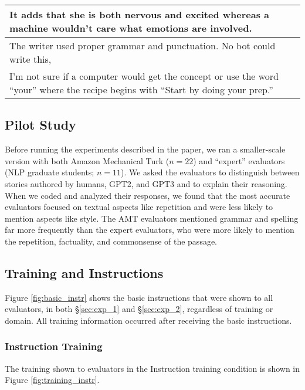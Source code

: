 \begin{table*}[t!]
\begin{tabular}{p{\linewidth}}
\midrule
It adds that she is both nervous and excited whereas a machine wouldn't care what emotions are involved. \\
\midrule
The writer used proper grammar and punctuation. No bot could write this, \\
\midrule
I'm not sure if a computer would get the concept or use the word ``your'' where the recipe begins with ``Start by doing your prep.'' \\
\bottomrule
\end{tabular}
\caption{Example reasons evaluators gave for their decisions that spoke to their beliefs about current NLG capabilities.}
\label{tab:HUM}
\end{table*}

\subsection{Pilot Study}\label{app:pilot}
Before running the experiments described in the paper, we ran a smaller-scale version with both Amazon Mechanical Turk ($n=22$) and ``expert'' evaluators (NLP graduate students; $n=11$).
We asked the evaluators to distinguish between stories authored by humans, GPT2, and GPT3 and to explain their reasoning.
When we coded and analyzed their responses, we found that the most accurate evaluators focused on textual aspects like repetition and were less likely to mention aspects like style.
The AMT evaluators mentioned grammar and spelling far more frequently than the expert evaluators, who were more likely to mention the repetition, factuality, and commonsense of the passage.

\subsection{Training and Instructions}\label{app:training+instructions}
Figure \ref{fig:basic_instr} shows the basic instructions that were shown to all evaluators, in both \S\ref{sec:exp_1} and \S\ref{sec:exp_2}, regardless of training or domain.
All training information occurred after receiving the basic instructions.

\begin{figure*}
\centering
{}
\caption{Basic instructions shown to all evaluators.}
\label{fig:basic_instr}
\end{figure*}

\subsubsection{Instruction Training}\label{app:train_instructions}
The training shown to evaluators in the Instruction training condition is shown in Figure \ref{fig:training_instr}.
\begin{figure*}
\centering
{}
\caption{The Instruction training.}
\label{fig:training_instr}
\end{figure*}



